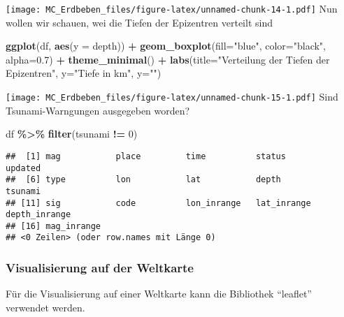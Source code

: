 \documentclass[
]{article}
\newenvironment{Shaded}{\begin{snugshade}}{\end{snugshade}}
\newcommand{\AttributeTok}[1]{\textcolor[rgb]{0.13,0.29,0.53}{#1}}
\newcommand{\DecValTok}[1]{\textcolor[rgb]{0.00,0.00,0.81}{#1}}
\newcommand{\FloatTok}[1]{\textcolor[rgb]{0.00,0.00,0.81}{#1}}
\newcommand{\FunctionTok}[1]{\textcolor[rgb]{0.13,0.29,0.53}{\textbf{#1}}}
\newcommand{\NormalTok}[1]{#1}
\newcommand{\SpecialCharTok}[1]{\textcolor[rgb]{0.81,0.36,0.00}{\textbf{#1}}}
\newcommand{\StringTok}[1]{\textcolor[rgb]{0.31,0.60,0.02}{#1}}
\begin{document}
\texttt{[image: MC\_Erdbeben\_files/figure-latex/unnamed-chunk-14-1.pdf]}
Nun wollen wir schauen, wei die Tiefen der Epizentren verteilt sind

\begin{Shaded}
\begin{Highlighting}[]
\FunctionTok{ggplot}\NormalTok{(df, }\FunctionTok{aes}\NormalTok{(}\AttributeTok{y =}\NormalTok{ depth)) }\SpecialCharTok{+}
  \FunctionTok{geom\_boxplot}\NormalTok{(}\AttributeTok{fill=}\StringTok{"blue"}\NormalTok{, }\AttributeTok{color=}\StringTok{"black"}\NormalTok{, }\AttributeTok{alpha=}\FloatTok{0.7}\NormalTok{) }\SpecialCharTok{+}
  \FunctionTok{theme\_minimal}\NormalTok{() }\SpecialCharTok{+}
  \FunctionTok{labs}\NormalTok{(}\AttributeTok{title=}\StringTok{"Verteilung der Tiefen der Epizentren"}\NormalTok{, }\AttributeTok{y=}\StringTok{"Tiefe in km"}\NormalTok{, }\AttributeTok{y=}\StringTok{""}\NormalTok{) }
\end{Highlighting}
\end{Shaded}

\texttt{[image: MC\_Erdbeben\_files/figure-latex/unnamed-chunk-15-1.pdf]}
Sind Tsunami-Warngungen ausgegeben worden?

\begin{Shaded}
\begin{Highlighting}[]
\NormalTok{df }\SpecialCharTok{\%\textgreater{}\%} \FunctionTok{filter}\NormalTok{(tsunami }\SpecialCharTok{!=} \DecValTok{0}\NormalTok{)}
\end{Highlighting}
\end{Shaded}

\begin{verbatim}
##  [1] mag           place         time          status        updated      
##  [6] type          lon           lat           depth         tsunami      
## [11] sig           code          lon_inrange   lat_inrange   depth_inrange
## [16] mag_inrange  
## <0 Zeilen> (oder row.names mit Länge 0)
\end{verbatim}

\hypertarget{visualisierung-auf-der-weltkarte}{%
\subsubsection{Visualisierung auf der
Weltkarte}\label{visualisierung-auf-der-weltkarte}}

Für die Visualisierung auf einer Weltkarte kann die Bibliothek
``leaflet'' verwendet werden.
\end{document}
